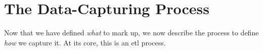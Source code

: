 \section{The Data-Capturing Process}
\label{sec:dataset:process}

Now that we have defined \textit{what} to mark up, we now describe the process to define \textit{how} we capture it. At its core, this is an \gls{etl} process. 

